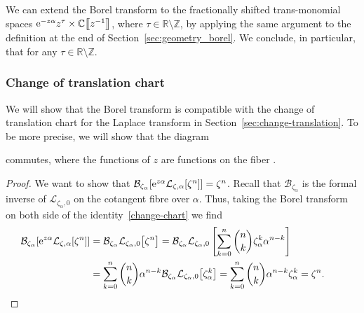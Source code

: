 \documentclass[pdftex]{sigma}
\newcommand{\Z}{\mathbb{Z}}
\newcommand{\R}{\mathbb{R}}
\newcommand{\C}{\mathbb{C}}
\newcommand{\laplace}{\mathcal{L}}
\newcommand{\borel}{\mathcal{B}}
\numberwithin{equation}{section}
\begin{document}
We can extend the Borel transform to the fractionally shifted trans-monomial spaces ${\rm e}^{-z\alpha} z^\tau\allowbreak\times \C\big\llbracket z^{-1} \big\rrbracket$, where $\tau \in \R \setminus \Z$, by applying the same argument to the definition at the end of Section~\ref{sec:geometry_borel}. We conclude, in particular, that
\smash{$\borel_{\zeta}\bigl[{\rm e}^{-z\alpha}z^{-\tau-1}\bigr] = \frac{\zeta_\alpha^\tau}{\Gamma(\tau+1)}$}
for any $\tau \in \R\setminus\Z$.

\subsubsection{Change of translation chart}\label{transl-borel}
We will show that the Borel transform is compatible with the change of translation chart for the Laplace transform in Section~\ref{sec:change-translation}. To be more precise, we will show that the diagram{\samepage
\begin{center}
\end{center}
commutes, where the functions of $z$ are functions on the fiber .}

\begin{proof}
We want to show that
$\borel_{\zeta_\alpha}[{\rm e}^{z\alpha} \laplace_{\zeta,\alpha}[\zeta^n]]=\zeta^n$.
Recall that $\borel_{\zeta_\alpha}$
is the formal inverse of $\laplace_{\zeta_\alpha,0}$ on the cotangent fibre over $\alpha$. Thus, taking the Borel transform on both side of the identity~\eqref{change-chart} we find
 \begin{align*}
 \borel_{\zeta_\alpha}[{\rm e}^{z\alpha} \laplace_{\zeta,\alpha}[\zeta^n]]&=\borel_{\zeta_\alpha}\laplace_{\zeta_\alpha,0}\bigl[\zeta^n\bigr]=\borel_{\zeta_\alpha}\laplace_{\zeta_\alpha,0}\left[\sum_{k=0}^n{n\choose k}\zeta_\alpha^k \alpha^{n-k}\right]\\
 &=\sum_{k=0}^n{n\choose k} \alpha^{n-k}\borel_{\zeta_\alpha}\laplace_{\zeta_\alpha,0}\bigl[\zeta_\alpha^k \bigr]=\sum_{k=0}^n{n\choose k} \alpha^{n-k}\zeta_\alpha^k=\zeta^n.\tag*{\qed}
 \end{align*}\renewcommand{\qed}{}
\end{proof}
\end{document}
